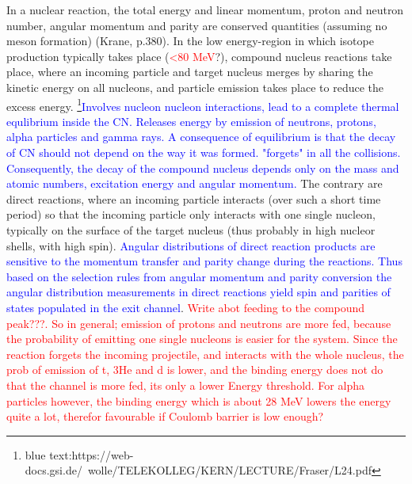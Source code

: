 \documentclass[a4paper,11pt,twoside]{book}
\begin{document}
In a nuclear reaction, the total energy and linear momentum, proton and neutron number, angular momentum and parity are conserved quantities (assuming no meson formation) (Krane, p.380). In the low energy-region in which isotope production typically takes place (\textcolor{red}{<80 MeV}?), compound nucleus reactions take place, where an incoming particle and target nucleus merges by sharing the kinetic energy on all nucleons, and particle emission takes place to reduce the excess energy. \textcolor{blue}{\footnote{blue text:https://web-docs.gsi.de/~wolle/TELEKOLLEG/KERN/LECTURE/Fraser/L24.pdf }Involves nucleon nucleon interactions, lead to a complete thermal equlibrium inside the CN. Releases energy by emission of neutrons, protons, alpha particles and gamma rays. A consequence of equilibrium is that the decay of CN should not depend on the way it was formed. "forgets" in all the collisions. Consequently, the decay of the compound nucleus depends only on the mass and atomic numbers, excitation energy and angular momentum.} The contrary are direct reactions, where an incoming particle interacts (over such a short time period) so that the incoming particle only interacts with one single nucleon, typically on the surface of the target nucleus (thus probably in high nucleor shells, with high spin). \textcolor{blue}{Angular distributions of direct reaction products are sensitive to the momentum transfer and parity change during the reactions. Thus based on the selection rules from angular momentum and parity conversion the angular distribution measurements in direct reactions yield spin and parities of states populated in the exit channel}. \textcolor{red}{Write abot feeding to the compound peak???. So in general; emission of protons and neutrons are more fed, because the probability of emitting one single nucleons is easier for the system. Since the reaction forgets the incoming projectile, and interacts with the whole nucleus, the prob of emission of t, 3He and d is lower, and the binding energy does not do that the channel is more fed, its only a lower Energy threshold. For alpha particles however, the binding energy which is about 28 MeV lowers the energy quite a lot, therefor favourable if Coulomb barrier is low enough?} \\

\end{document}

